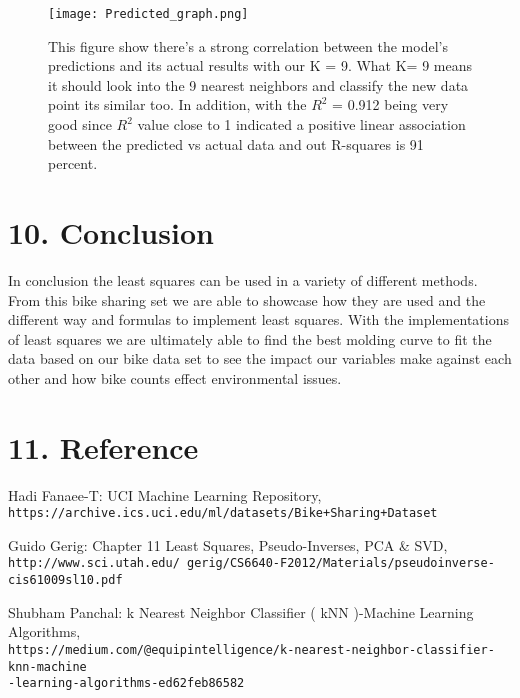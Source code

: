 \documentclass[
]{article}
\begin{document}
\begin{figure}
\centering
\texttt{[image: Predicted\_graph.png]}
\caption{This figure show there’s a strong correlation between the model’s predictions and its actual results with our K = 9. What K= 9 means it should look into the 9 nearest neighbors and classify the new data point its similar too. In addition, with the $R^2$ = 0.912 being very good since $R^2$ value close to 1 indicated a positive linear association between the predicted vs actual data and out R-squares is 91 percent.}
\end{figure}


\hypertarget{conclusion}{%
\section{10. Conclusion }\label{conclusion}}
In conclusion the least squares can be used in a variety of different methods. From this bike sharing set we are able to showcase how they are used and the different way and formulas to implement least squares. With the implementations of least squares we are ultimately able to find the best molding curve to fit the data based on our bike data set to see the impact our variables make against each other and how bike counts effect environmental issues. 


\hypertarget{reference}{%
\section{11. Reference}\label{refrence}}

Hadi Fanaee-T: UCI Machine Learning Repository,
\\\texttt{https://archive.ics.uci.edu/ml/datasets/Bike+Sharing+Dataset}

Guido Gerig: Chapter 11 Least Squares, Pseudo-Inverses, PCA & SVD,
\\\texttt{http://www.sci.utah.edu/~gerig/CS6640-F2012/Materials/pseudoinverse-cis61009sl10.pdf}

Shubham Panchal: k Nearest Neighbor Classifier ( kNN )-Machine Learning Algorithms,
\\\texttt{https://medium.com/@equipintelligence/k-nearest-neighbor-classifier-knn-machine\\
-learning-algorithms-ed62feb86582}
\end{document}
